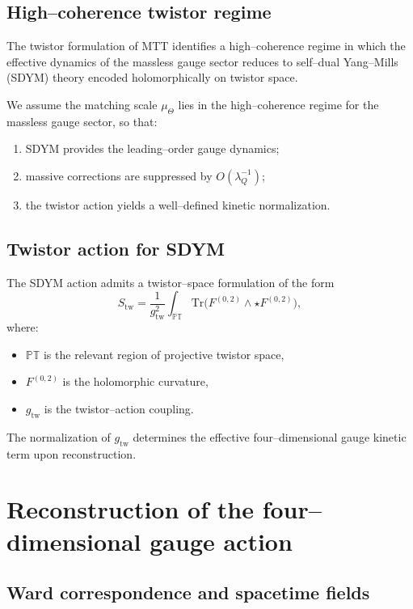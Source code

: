 \documentclass[11pt]{article}
\begin{document}
\subsection{High--coherence twistor regime}

The twistor formulation of MTT identifies a high--coherence regime in which the
effective dynamics of the massless gauge sector reduces to self--dual Yang--Mills
(SDYM) theory encoded holomorphically on twistor space.

\begin{assumption}
We assume the matching scale $\mu_\Theta$ lies in the high--coherence regime
for the massless gauge sector, so that:
\begin{enumerate}
\item SDYM provides the leading--order gauge dynamics;
\item massive corrections are suppressed by $O(\lambda_Q^{-1})$;
\item the twistor action yields a well--defined kinetic normalization.
\end{enumerate}
\end{assumption}

\subsection{Twistor action for SDYM}

The SDYM action admits a twistor--space formulation of the form
\[
S_{\mathrm{tw}} = \frac{1}{g_{\mathrm{tw}}^2}
\int_{\mathbb{PT}} \mathrm{Tr}\big(F^{(0,2)}\wedge \star F^{(0,2)}\big),
\]
where:
\begin{itemize}
\item $\mathbb{PT}$ is the relevant region of projective twistor space,
\item $F^{(0,2)}$ is the holomorphic curvature,
\item $g_{\mathrm{tw}}$ is the twistor--action coupling.
\end{itemize}

The normalization of $g_{\mathrm{tw}}$ determines the effective four--dimensional
gauge kinetic term upon reconstruction.

\section{Reconstruction of the four--dimensional gauge action}

\subsection{Ward correspondence and spacetime fields}
\end{document}
